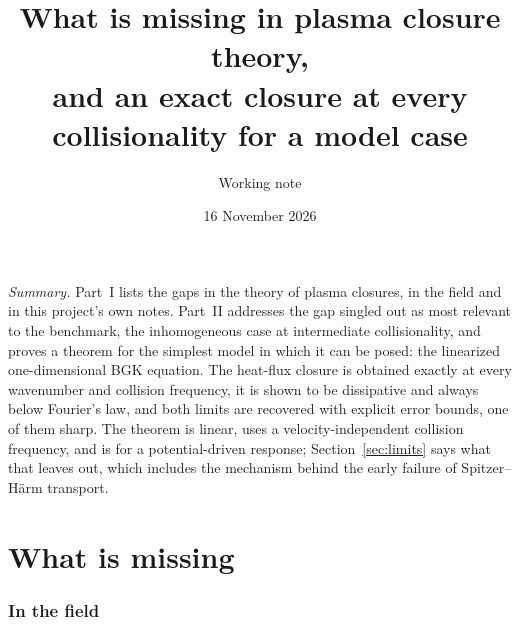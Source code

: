 \documentclass[11pt]{article}
\title{What is missing in plasma closure theory,\\
and an exact closure at every collisionality for a model case}
\author{Working note}
\date{16 November 2026}
\theoremstyle{remark}
\begin{document}
\maketitle

\noindent\emph{Summary.} Part~I lists the gaps in the theory of plasma
closures, in the field and in this project's own notes. Part~II addresses
the gap singled out as most relevant to the benchmark, the inhomogeneous
case at intermediate collisionality, and proves a theorem for the simplest
model in which it can be posed: the linearized one-dimensional BGK equation.
The heat-flux closure is obtained exactly at every wavenumber and collision
frequency, it is shown to be dissipative and always below Fourier's law, and
both limits are recovered with explicit error bounds, one of them sharp. The
theorem is linear, uses a velocity-independent collision frequency, and is
for a potential-driven response; Section~\ref{sec:limits} says what that
leaves out, which includes the mechanism behind the early failure of
Spitzer--H\"arm transport.

\tableofcontents

\part{What is missing}

\section{In the field}
\end{document}
